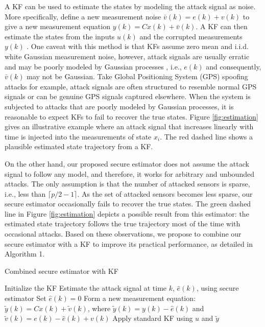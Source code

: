 \documentclass[../../thesis.tex]{subfiles}
\newcommand{\norm}[1]{\left\lVert#1\right\rVert}
\begin{document}
A KF can be used to estimate the states by modeling the attack signal as noise. More specifically, define a new measurement noise $\bar{v}(k) = e(k) + v(k)$ to give a new measurement equation $y(k) = C x(k) + \bar{v}(k)$. A KF can then estimate the states from the inputs $u(k)$ and the corrupted measurements $y(k)$ \cite{KwonACC}. 
One caveat with this method is that KFs assume zero mean and i.i.d. white Gaussian measurement noise, however, attack signals are usually erratic and may be poorly modeled by Gaussian processes \cite{KwonACC}, i.e., $e(k)$ and consequently, $\bar v(k)$ may not be Gaussian. Take Global Positioning System (GPS) spoofing attacks for example, attack signals are often structured to resemble normal GPS signals or can be genuine GPS signals captured elsewhere.  
When the system is subjected to attacks that are poorly modeled by Gaussian processes, it is reasonable to expect KFs to fail to recover the true states. 
Figure \ref{fig:estimation} gives an illustrative example where an attack signal that increases linearly with time is injected into the measurements of state $x_i$. The red dashed line shows a plausible estimated state trajectory from a KF.

On the other hand, our proposed secure estimator does not assume the attack signal to follow any model, and therefore, it works for arbitrary and unbounded attacks. 
The only assumption is that the number of attacked sensors is sparse, i.e., less than $\lceil p/2-1\rceil$. 
As the set of attacked sensors becomes less sparse, our secure estimator occasionally fails to recover the true states.
The green dashed line in Figure \ref{fig:estimation} depicts a possible result from this estimator: the estimated state trajectory follows the true trajectory most of the time with occasional attacks. 
Based on these observations, we propose to combine our secure estimator with a KF to improve its practical performance, as detailed in Algorithm 1.
\begin{algorithm}
\caption{Combined secure estimator with KF}
\label{al:se_kf}
\begin{algorithmic}[1]
\State Initialize the KF
		\State Estimate the attack signal at time $k$, $\hat e(k)$, using secure estimator
	\Else
		\State Set $\hat e(k) = 0$
	\EndIf
	\State Form a new measurement equation: $\tilde y(k) =  C x(k) + \tilde v(k)$, where $\tilde y(k) = y(k) - \hat e(k)$ and $ \tilde v(k) = e (k) - \hat e(k) + v(k)$
	\State Apply standard KF using $u$ and $\tilde y$ 
\EndFor
\end{algorithmic}
\end{algorithm}
\end{document}
